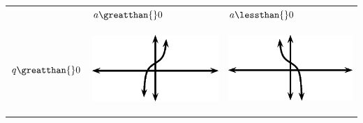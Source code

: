 \begin{center}
\label{m39414*uid86}
\noindent
{}
\tablelasttail{}
\begin{xtabular*}{\mytablewidth}[t]{|p{10\mystarwidth}|p{10\mystarwidth}|p{10\mystarwidth}|}\hline
&
    $a\greatthan{}0$
    &
    $a\lessthan{}0$
\tabularnewline{}
    $q\greatthan{}0$
    &
\setcounter{subfigure}{0}
\label{m39414*id90981}
\begin{center}
\label{m39414*id90981!!!underscore!!!media}\label{m39414*id90981!!!underscore!!!printimage}\includegraphics{col11306.imgs/m39414_MG10C15_034.png} %
\vspace{2pt}
\vspace{.1in}
\end{center}    
    &
\setcounter{subfigure}{0}
\label{m39414*id90993}
\begin{center}
\label{m39414*id90993!!!underscore!!!media}\label{m39414*id90993!!!underscore!!!printimage}\includegraphics{col11306.imgs/m39414_MG10C15_035.png} %

\end{center}
\end{xtabular*}
\end{center}
